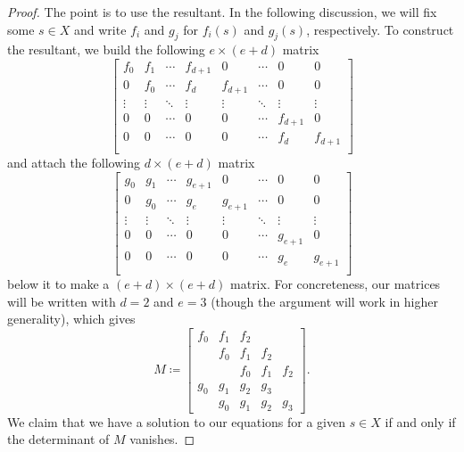 \documentclass[../notes.tex]{subfiles}
\begin{document}
\begin{proof}
	The point is to use the resultant. In the following discussion, we will fix some $s\in X$ and write $f_i$ and $g_j$ for $f_i(s)$ and $g_j(s)$, respectively. To construct the resultant, we build the following $e\times(e+d)$ matrix
	\[\begin{bmatrix}
		f_0 & f_1 & \cdots & f_{d+1} & 0 & \cdots & 0 & 0 \\
		0 & f_0 & \cdots & f_d & f_{d+1} & \cdots & 0 & 0\\
		\vdots & \vdots & \ddots & \vdots & \vdots & \ddots & \vdots & \vdots \\
		0 & 0 & \cdots & 0 & 0 & \cdots & f_{d+1} & 0 \\
		0 & 0 & \cdots & 0 & 0 & \cdots & f_d & f_{d+1} \\
	\end{bmatrix}\]
	and attach the following $d\times(e+d)$ matrix
	\[\begin{bmatrix}
		g_0 & g_1 & \cdots & g_{e+1} & 0 & \cdots & 0 & 0 \\
		0 & g_0 & \cdots & g_e & g_{e+1} & \cdots & 0 & 0\\
		\vdots & \vdots & \ddots & \vdots & \vdots & \ddots & \vdots & \vdots \\
		0 & 0 & \cdots & 0 & 0 & \cdots & g_{e+1} & 0 \\
		0 & 0 & \cdots & 0 & 0 & \cdots & g_e & g_{e+1} \\
	\end{bmatrix}\]
	below it to make a $(e+d)\times(e+d)$ matrix. For concreteness, our matrices will be written with $d=2$ and $e=3$ (though the argument will work in higher generality), which gives
	\[M\coloneqq\begin{bmatrix}
		f_0 & f_1 & f_2 \\
		    & f_0 & f_1 & f_2 \\
			&     & f_0 & f_1 & f_2 \\
		g_0 & g_1 & g_2 & g_3 \\
		    & g_0 & g_1 & g_2 & g_3
	\end{bmatrix}.\]
	We claim that we have a solution to our equations for a given $s\in X$ if and only if the determinant of $M$ vanishes.


\end{proof}
\end{document}
